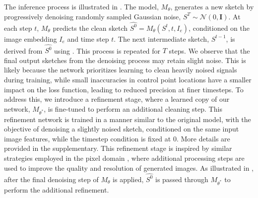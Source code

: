 The inference process is illustrated in . The model, $M_{\theta}$, generates a new sketch by progressively denoising randomly sampled Gaussian noise, $S^T \sim \mathcal{N}(0, \mathbf{I})$. At each step $t$, $M_{\theta}$ predicts the clean sketch $\hat{S^0} = M_{\theta}(S^t, t, I_e)$, conditioned on the image embedding $I_e$ and time step $t$. The next intermediate sketch, $S^{t-1}$, is derived from $\hat{S^0}$ using . This process is repeated for $T$ steps.
We observe that the final output sketches from the denoising process may retain slight noise. This is likely because the network prioritizes learning to clean heavily noised signals during training, while small inaccuracies in control point locations have a smaller impact on the loss function, leading to reduced precision at finer timesteps.
To address this, we introduce a refinement stage, where a learned copy of our network, $M_{\theta^*}$, is fine-tuned to perform an additional cleaning step. This refinement network is trained in a manner similar to the original model, with the objective of denoising a slightly noised sketch, conditioned on the same input image features, while the timestep condition is fixed at 0. More details are provided in the supplementary. This refinement stage is inspired by similar strategies employed in the pixel domain \cite{podell2023sdxlimprovinglatentdiffusion,saharia2022photorealistic}, where additional processing steps are used to improve the quality and resolution of generated images. As illustrated in , after the final denoising step of $M_\theta$ is applied, $\hat{S^0}$ is passed through $M_{\theta^*}$ to perform the additional refinement.











